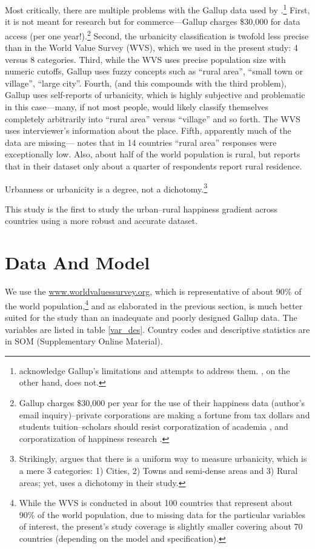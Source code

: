\documentclass[10pt, letterpaper]{article}
\begin{document}
Most critically, there are multiple problems with the Gallup data used by \citet{easterlin10al,burger20}.\footnote{\citet{easterlin10al} acknowledge Gallup's limitations and attempts
to address them. \citet{burger20}, on the other hand, does not.}  First, it is not meant for
research but for commerce---Gallup charges \$30,000 for data access (per one
year!).\footnote{Gallup charges \$30,000 per year for the use of their happiness data (author's
email inquiry)--private corporations are making a fortune from tax dollars and students tuition--scholars should resist corporatization of academia \citep{mills2012corporatization,cox2013corporatization,millsNYT12fa,CatropaNYT20feb8,schmidlinNYT15oct10}, and
corporatization of happiness research \citep{davies15}.} Second, the urbanicity classification is twofold less precise than in the World Value Survey (WVS), which we used in the present study: 4
versus 8 categories. Third, while the WVS uses precise population size with numeric cutoffs,
Gallup uses fuzzy concepts such as ``rural area'', ``small town or village'', ``large city''.
Fourth, (and this compounds with the third problem), Gallup uses self-reports of urbanicity, which is highly
subjective and problematic in this case---many, if not most people, would likely
classify themselves completely arbitrarily into ``rural area'' versus ``village'' and so forth. The WVS uses interviewer's information about the place. Fifth, apparently much of the data are missing---\citet{easterlin10al} notes that in 14 countries ``rural area'' responses were exceptionally low.
Also, about half of the world population is rural, but \citet{burger20} reports that in their
dataset only about a quarter of respondents report rural residence.

Urbanness or urbanicity is a degree, not a dichotomy.\footnote{Strikingly, \citet{burger20} argues that there is a uniform way to measure urbanicity, which is a mere 3 categories: 1)
Cities, 2) Towns and semi-dense areas and 3) Rural areas; yet, uses a dichotomy in their study.} 

This study is the first to study the urban--rural happiness gradient across countries using a more robust and accurate dataset. 

\section*{Data And Model}

We use the \url{www.worldvaluessurvey.org}, which is representative of about 90\% of
the world population,\footnote{While the WVS is conducted in about 100 countries
  that represent about 90\% of the world population, due to missing data for
  the particular variables of interest, the present's study coverage is slightly
smaller covering about 70 countries (depending on the model and specification).} and as elaborated in the previous section, is much better suited for the study than an inadequate and poorly designed Gallup data. The variables are listed in table \ref{var_des}. 
Country codes and descriptive statistics are in SOM (Supplementary Online Material).  %
\end{document}
